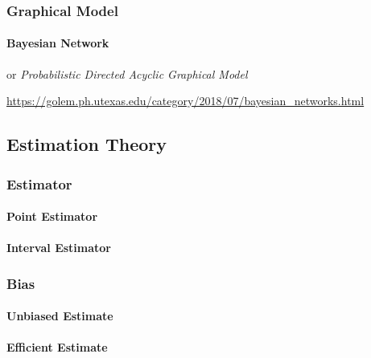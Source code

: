 \subsubsection{Graphical Model}\label{sec:graphical_model}

\paragraph{Bayesian Network}\label{sec:bayesian_network}\hfill

or \emph{Probabilistic Directed Acyclic Graphical Model}

\url{https://golem.ph.utexas.edu/category/2018/07/bayesian_networks.html}



\subsection{Estimation Theory}\label{sec:estimation_theory}

\subsubsection{Estimator}\label{sec:estimator}

\paragraph{Point Estimator}\label{sec:point_estimator}\hfill

\paragraph{Interval Estimator}\label{sec:interval_estimator}\hfill



\subsubsection{Bias}\label{sec:bias}

\paragraph{Unbiased Estimate}\label{sec:unbiased_estimate}\hfill

\paragraph{Efficient Estimate}\label{sec:efficient_estimate}\hfill

